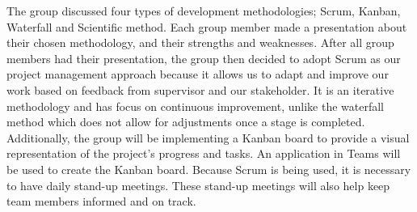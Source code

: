 The group discussed four types of development methodologies; Scrum, Kanban, Waterfall and Scientific method. Each group member made a presentation about their chosen methodology, and their strengths and weaknesses. After all group members had their presentation, the group then decided to adopt Scrum as our project management approach because it allows us to adapt and improve our work based on feedback from supervisor and our stakeholder. It is an iterative methodology and has focus on continuous improvement, unlike the waterfall method which does not allow for adjustments once a stage is completed. Additionally, the group will be implementing a Kanban board to provide a visual representation of the project's progress and tasks. An application in Teams will be used to create the Kanban board. Because Scrum is being used, it is necessary to have daily stand-up meetings. These stand-up meetings will also help keep team members informed and on track. 

